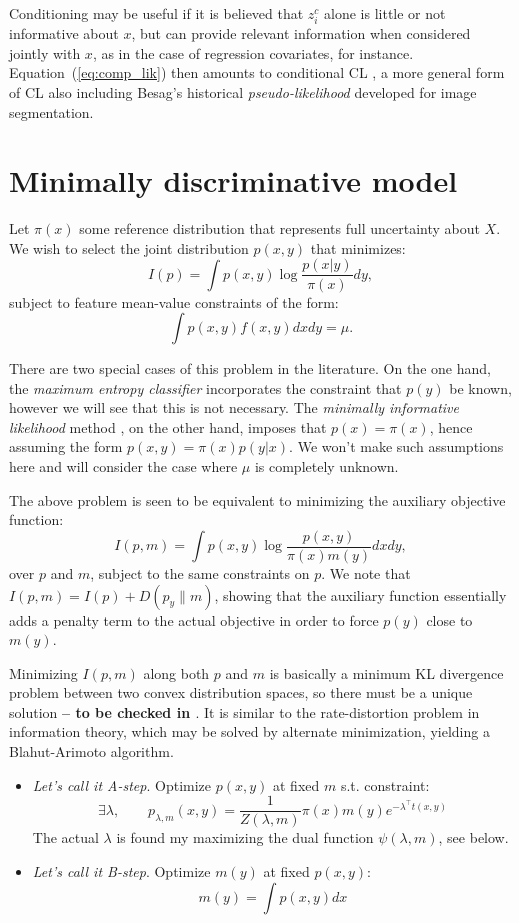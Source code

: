 \documentclass[english]{scrartcl}
\begin{document}
Conditioning may be useful if it is believed that $z^c_i$ alone is little or not informative about $x$, but can provide relevant information when considered jointly with $x$, as in the case of regression covariates, for instance. Equation~(\ref{eq:comp_lik}) then amounts to conditional CL \cite{Varin-11}, a more general form of CL also including Besag's historical {\em pseudo-likelihood} \cite{Besag-74} developed for image segmentation.


\section{Minimally discriminative model}

Let $\pi(x)$ some reference distribution that represents full
uncertainty about $X$. We wish to select the joint distribution
$p(x,y)$ that minimizes:
$$
I(p) = \int p(x,y) \log \frac{p(x|y)}{\pi(x)} dy,
$$ subject to feature mean-value constraints of the form:
$$
\int p(x,y) f(x,y) dx dy = \mu.
$$

There are two special cases of this problem in the literature.  On the
one hand, the {\em maximum entropy classifier} \cite{BergerA-96}
incorporates the constraint that $p(y)$ be known, however we will see
that this is not necessary. The {\em minimally informative likelihood}
method \cite{Yuan-99b,Yuan-99}, on the other hand, imposes that
$p(x)=\pi(x)$, hence assuming the form $p(x,y)=\pi(x)p(y|x)$. We won't
make such assumptions here and will consider the case where $\mu$ is
completely unknown.

The above problem is seen to be equivalent to minimizing the auxiliary
objective function:
$$
I(p,m) 
= \int p(x,y) \log \frac{p(x,y)}{\pi(x)m(y)} dxdy,
$$ over $p$ and $m$, subject to the same constraints on $p$. We note
that $I(p,m)=I(p)+D(p_y\|m)$, showing that the auxiliary function
essentially adds a penalty term to the actual objective in order to
force $p(y)$ close to $m(y)$.

Minimizing $I(p,m)$ along both $p$ and $m$ is basically a minimum KL
divergence problem between two convex distribution spaces, so there
must be a unique solution {\bf -- to be checked in
  \cite{Cover-91}}. It is similar to the rate-distortion problem in
information theory, which may be solved by alternate minimization,
yielding a Blahut-Arimoto algorithm.
\begin{itemize}
\item {\em Let's call it A-step}. Optimize $p(x,y)$ at fixed $m$
  s.t. constraint:
$$
\exists \lambda, \qquad
p_{\lambda,m}(x,y) = \frac{1}{Z(\lambda, m)} \pi(x) m(y) e^{-\lambda^\top t(x,y)}
$$
The actual $\lambda$ is found my maximizing the dual function
$\psi(\lambda,m)$, see below.
\item {\em Let's call it B-step}. Optimize $m(y)$ at fixed $p(x,y)$:
$$
m(y) = \int p(x,y) dx
$$
\end{itemize}
\end{document}
